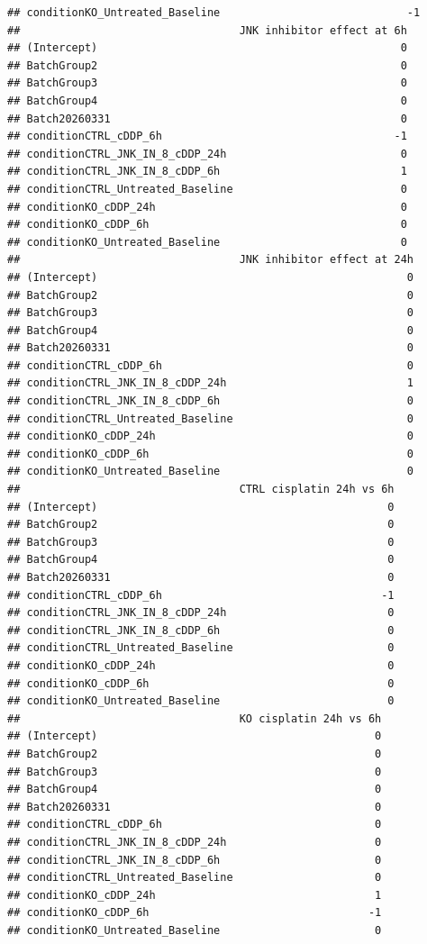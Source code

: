 \documentclass[
  10pt,
]{article}
\begin{document}
\begin{verbatim}
## conditionKO_Untreated_Baseline                             -1
##                                  JNK inhibitor effect at 6h
## (Intercept)                                               0
## BatchGroup2                                               0
## BatchGroup3                                               0
## BatchGroup4                                               0
## Batch20260331                                             0
## conditionCTRL_cDDP_6h                                    -1
## conditionCTRL_JNK_IN_8_cDDP_24h                           0
## conditionCTRL_JNK_IN_8_cDDP_6h                            1
## conditionCTRL_Untreated_Baseline                          0
## conditionKO_cDDP_24h                                      0
## conditionKO_cDDP_6h                                       0
## conditionKO_Untreated_Baseline                            0
##                                  JNK inhibitor effect at 24h
## (Intercept)                                                0
## BatchGroup2                                                0
## BatchGroup3                                                0
## BatchGroup4                                                0
## Batch20260331                                              0
## conditionCTRL_cDDP_6h                                      0
## conditionCTRL_JNK_IN_8_cDDP_24h                            1
## conditionCTRL_JNK_IN_8_cDDP_6h                             0
## conditionCTRL_Untreated_Baseline                           0
## conditionKO_cDDP_24h                                       0
## conditionKO_cDDP_6h                                        0
## conditionKO_Untreated_Baseline                             0
##                                  CTRL cisplatin 24h vs 6h
## (Intercept)                                             0
## BatchGroup2                                             0
## BatchGroup3                                             0
## BatchGroup4                                             0
## Batch20260331                                           0
## conditionCTRL_cDDP_6h                                  -1
## conditionCTRL_JNK_IN_8_cDDP_24h                         0
## conditionCTRL_JNK_IN_8_cDDP_6h                          0
## conditionCTRL_Untreated_Baseline                        0
## conditionKO_cDDP_24h                                    0
## conditionKO_cDDP_6h                                     0
## conditionKO_Untreated_Baseline                          0
##                                  KO cisplatin 24h vs 6h
## (Intercept)                                           0
## BatchGroup2                                           0
## BatchGroup3                                           0
## BatchGroup4                                           0
## Batch20260331                                         0
## conditionCTRL_cDDP_6h                                 0
## conditionCTRL_JNK_IN_8_cDDP_24h                       0
## conditionCTRL_JNK_IN_8_cDDP_6h                        0
## conditionCTRL_Untreated_Baseline                      0
## conditionKO_cDDP_24h                                  1
## conditionKO_cDDP_6h                                  -1
## conditionKO_Untreated_Baseline                        0
\end{verbatim}
\end{document}
